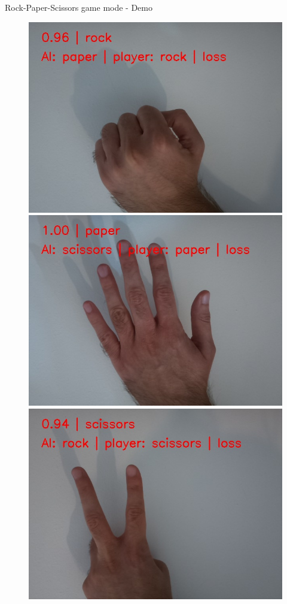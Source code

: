 \begin{frame}{Rock-Paper-Scissors game mode - Demo}
\begin{figure}
	\includegraphics[width=0.33\linewidth,height=0.5\textheight,keepaspectratio]{images/rock_game_loss.jpeg}%
	\includegraphics[width=0.33\linewidth,height=0.5\textheight,keepaspectratio]{images/paper_game_loss.jpeg}%
	\includegraphics[width=0.33\linewidth,height=0.5\textheight,keepaspectratio]{images/scissors_game_loss.jpeg}
  \end{figure}
\end{frame}

